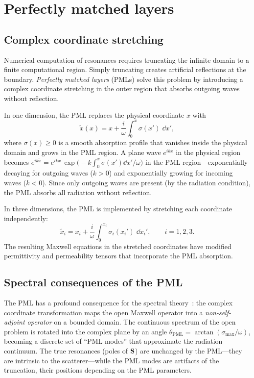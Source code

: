 \section{Perfectly matched layers}
\label{sec:pml}

\subsection{Complex coordinate stretching}
\label{ssec:pml-stretching}

Numerical computation of resonances requires truncating the infinite
domain to a finite computational region. Simply truncating creates
artificial reflections at the boundary. \emph{Perfectly matched layers}
(PMLs) solve this problem by introducing a complex coordinate
stretching in the outer region that absorbs outgoing waves without
reflection.

In one dimension, the PML replaces the physical coordinate $x$ with
\begin{equation}
 \tilde{x}(x) = x + \frac{i}{\omega}\int_0^x \sigma(x')\;\dd x',
 \label{eq:pml-stretch}
\end{equation}
where $\sigma(x) \ge 0$ is a smooth absorption profile that vanishes
inside the physical domain and grows in the PML region. A plane wave
$e^{ikx}$ in the physical region becomes
$e^{ik\tilde{x}} = e^{ikx}\,\exp\!\bigl(-k\int_0^x\sigma(x')\dd x'/\omega\bigr)$
in the PML region---exponentially decaying for outgoing waves ($k > 0$)
and exponentially growing for incoming waves ($k < 0$). Since only
outgoing waves are present (by the radiation condition), the PML absorbs
all radiation without reflection.

In three dimensions, the PML is implemented by stretching each coordinate
independently:
\begin{equation}
 \tilde{x}_i = x_i + \frac{i}{\omega}\int_0^{x_i} \sigma_i(x_i')\;\dd x_i',
 \qquad i = 1,2,3.
 \label{eq:pml-3d}
\end{equation}
The resulting Maxwell equations in the stretched coordinates have modified
permittivity and permeability tensors that incorporate the PML absorption.

\subsection{Spectral consequences of the PML}
\label{ssec:pml-spectrum}

The PML has a profound consequence for the spectral
theory~\cite{vial2014quasimodal}: the complex coordinate transformation
maps the open Maxwell operator into a \emph{non-self-adjoint operator}
on a bounded domain. The continuous spectrum of the open problem is
rotated into the complex plane by an angle
$\theta_{\mathrm{PML}} = \arctan(\sigma_{\max}/\omega)$, becoming a
discrete set of ``PML modes'' that approximate the radiation continuum.
The true resonances (poles of $\mathbf{S}$) are unchanged by the PML---they
are intrinsic to the scatterer---while the PML modes are artifacts of
the truncation, their positions depending on the PML parameters.

